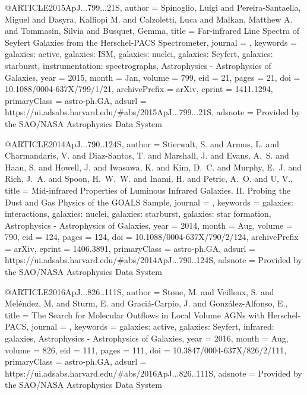 \documentclass[longauth]{aa}
\begin{document}
{{{{@ARTICLE{2015ApJ...799...21S,
       author = {{Spinoglio}, Luigi and {Pereira-Santaella}, Miguel and {Dasyra}, Kalliopi M. and {Calzoletti}, Luca and {Malkan}, Matthew A. and {Tommasin}, Silvia and {Busquet}, Gemma},
        title = {Far-infrared Line Spectra of Seyfert Galaxies from the Herschel-PACS Spectrometer},
      journal = {\apj},
     keywords = {galaxies: active, galaxies: ISM, galaxies: nuclei, galaxies: Seyfert, galaxies: starburst, instrumentation: spectrographs, Astrophysics - Astrophysics of Galaxies},
         year = 2015,
        month = Jan,
       volume = {799},
          eid = {21},
        pages = {21},
          doi = {10.1088/0004-637X/799/1/21},
archivePrefix = {arXiv},
       eprint = {1411.1294},
 primaryClass = {astro-ph.GA},
       adsurl = {https://ui.adsabs.harvard.edu/#abs/2015ApJ...799...21S},
      adsnote = {Provided by the SAO/NASA Astrophysics Data System}
}

@ARTICLE{2014ApJ...790..124S,
       author = {{Stierwalt}, S. and {Armus}, L. and {Charmandaris}, V. and {Diaz-Santos}, T. and {Marshall}, J. and {Evans}, A.~S. and {Haan}, S. and {Howell}, J. and {Iwasawa}, K. and {Kim}, D.~C. and {Murphy}, E.~J. and {Rich}, J.~A. and {Spoon}, H.~W.~W. and {Inami}, H. and {Petric}, A.~O. and {U}, V.},
        title = {Mid-infrared Properties of Luminous Infrared Galaxies. II. Probing the Dust and Gas Physics of the GOALS Sample},
      journal = {\apj},
     keywords = {galaxies: interactions, galaxies: nuclei, galaxies: starburst, galaxies: star formation, Astrophysics - Astrophysics of Galaxies},
         year = 2014,
        month = Aug,
       volume = {790},
          eid = {124},
        pages = {124},
          doi = {10.1088/0004-637X/790/2/124},
archivePrefix = {arXiv},
       eprint = {1406.3891},
 primaryClass = {astro-ph.GA},
       adsurl = {https://ui.adsabs.harvard.edu/#abs/2014ApJ...790..124S},
      adsnote = {Provided by the SAO/NASA Astrophysics Data System}
}

@ARTICLE{2016ApJ...826..111S,
       author = {{Stone}, M. and {Veilleux}, S. and {Mel{\'e}ndez}, M. and {Sturm}, E. and {Graci{\'a}-Carpio}, J. and {Gonz{\'a}lez-Alfonso}, E.},
        title = {The Search for Molecular Outflows in Local Volume AGNs with Herschel-PACS},
      journal = {\apj},
     keywords = {galaxies: active, galaxies: Seyfert, infrared: galaxies, Astrophysics - Astrophysics of Galaxies},
         year = 2016,
        month = Aug,
       volume = {826},
          eid = {111},
        pages = {111},
          doi = {10.3847/0004-637X/826/2/111},
 primaryClass = {astro-ph.GA},
       adsurl = {https://ui.adsabs.harvard.edu/#abs/2016ApJ...826..111S},
      adsnote = {Provided by the SAO/NASA Astrophysics Data System}
}

}}}}
\end{document}
